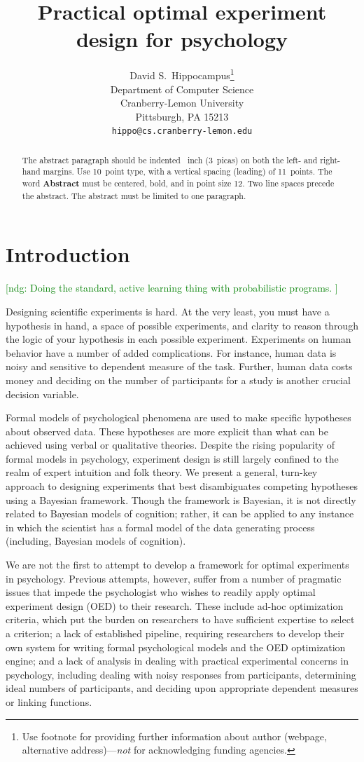\documentclass{article}
\title{Practical optimal experiment design for psychology}
\author{
  David S.~Hippocampus\thanks{Use footnote for providing further
    information about author (webpage, alternative
    address)---\emph{not} for acknowledging funding agencies.} \\
  Department of Computer Science\\
  Cranberry-Lemon University\\
  Pittsburgh, PA 15213 \\
  \texttt{hippo@cs.cranberry-lemon.edu} \\
}
\newcommand{\ndg}[1]{\textcolor{Green}{[ndg: #1]}}
\begin{document}

\maketitle

\begin{abstract}
  The abstract paragraph should be indented ~inch
  (3~picas) on both the left- and right-hand margins. Use 10~point
  type, with a vertical spacing (leading) of 11~points.  The word
  \textbf{Abstract} must be centered, bold, and in point size 12. Two
  line spaces precede the abstract. The abstract must be limited to
  one paragraph.
\end{abstract}

\section{Introduction}
\ndg{Doing the standard, active learning thing with probabilistic programs. }

Designing scientific experiments is hard.
At the very least, you must have a hypothesis in hand, a space of possible experiments, and clarity to reason through the logic of your hypothesis in each possible experiment.
Experiments on human behavior have a number of added complications.
For instance, human data is noisy and sensitive to dependent measure of the task. Further, human data costs money and deciding on the number of participants for a study is another crucial decision variable.

Formal models of psychological phenomena are used to make specific hypotheses about observed data.
These hypotheses are more explicit than what can be achieved using verbal or qualitative theories. Despite the rising popularity of formal models in psychology, experiment design is still largely confined to the realm of expert intuition and folk theory.
We present a general, turn-key approach to designing experiments that best disambiguates competing hypotheses using a Bayesian framework.
Though the framework is Bayesian, it is not directly related to Bayesian models of cognition; rather, it can be applied to any instance in which the scientist has a formal model of the data generating process (including, Bayesian models of cognition).

We are not the first to attempt to develop a framework for optimal experiments in psychology. Previous attempts, however, suffer from a number of pragmatic issues that impede the psychologist who wishes to readily apply optimal experiment design (OED) to their research.
These include ad-hoc optimization criteria, which put the burden on researchers to have sufficient expertise to select a criterion;
a lack of established pipeline, requiring researchers to develop their own system for writing formal psychological models and the OED optimization engine;
and a lack of analysis in dealing with practical experimental concerns in psychology, including dealing with noisy responses from participants, determining ideal numbers of participants, and deciding upon appropriate dependent measures or linking functions.
\end{document}

